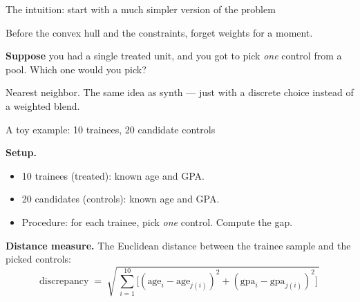 \documentclass[aspectratio=169,11pt]{beamer}
\begin{document}

\begin{frame}{The intuition: start with a much simpler version of the problem}
\vspace{0.5cm}

Before the convex hull and the constraints, forget weights for a moment.

\vspace{0.4cm}

\textbf{Suppose} you had a single treated unit, and you got to pick \textit{one} control from a pool. \;Which one would you pick?

\vspace{0.4cm}

 \;Nearest neighbor. \;The same idea as synth --- just with a discrete choice instead of a weighted blend.

\vspace{0.4em}

\vspace{0.2em}
\end{frame}

\begin{frame}{A toy example: 10 trainees, 20 candidate controls}
\vspace{0.5cm}

\textbf{Setup.}
\begin{itemize}\small\setlength\itemsep{1pt}
  \item 10 trainees (treated): \;known age and GPA.
  \item 20 candidates (controls): \;known age and GPA.
  \item Procedure: \;for each trainee, pick \textit{one} control. \;Compute the gap.
\end{itemize}

\vspace{0.5cm}

\textbf{Distance measure.} \;The Euclidean distance between the trainee sample and the picked controls:
\[
\text{discrepancy} \;=\; \sqrt{\,\sum_{i=1}^{10} \big[(\text{age}_i - \text{age}_{j(i)})^2 + (\text{gpa}_i - \text{gpa}_{j(i)})^2\big]\,}
\]

\vspace{0.3em}
\end{frame}
\end{document}
